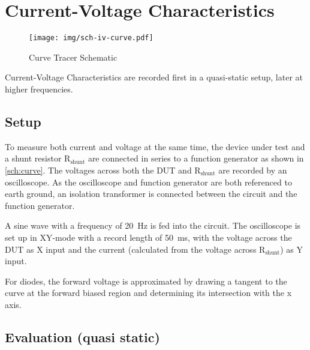 \chapter{Current-Voltage Characteristics}

\begin{figure}[tbp]
	\centering
	\texttt{[image: img/sch-iv-curve.pdf]}
	\caption{Curve Tracer Schematic}
	\label{sch:curve}
\end{figure}

Current-Voltage Characteristics are recorded first in a quasi-static setup, later at higher frequencies.

\section{Setup}

To measure both current and voltage at the same time, the device under test and a shunt resistor $\mathrm{R_{shunt}}$ are connected in series to a function generator as shown in \autoref{sch:curve}.
The voltages across both the DUT and $\mathrm{R_{shunt}}$ are recorded by an oscilloscope.
As the oscilloscope and function generator are both referenced to earth ground, an isolation transformer is connected between the circuit and the function generator.

A sine wave with a frequency of \SI{20}{\hertz} is fed into the circuit.
The oscilloscope is set up in XY-mode with a record length of \SI{50}{\ms}, with the voltage across the DUT as X input and the current (calculated from the voltage across $\mathrm{R_{shunt}}$) as Y input.

For diodes, the forward voltage is approximated by drawing a tangent to the curve at the forward biased region and determining its intersection with the x axis.

\section{Evaluation (quasi static)}

\def\ivsubfigwidth{0.45\textwidth}
\def\ivgraphicswidth{1.1\textwidth}

